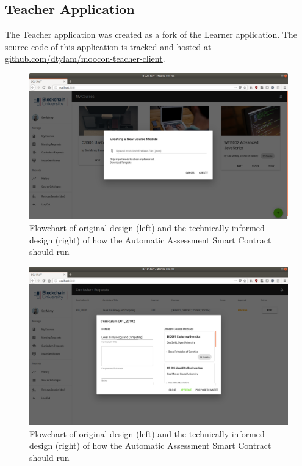 \subsection{Teacher Application}

The Teacher application was created as a fork of the Learner application. 
The source code of this application is tracked and hosted at 
\href{https://github.com/dtylam/moocon-teacher-client}{\underline{github.com/dtylam/moocon-teacher-client}}.

\begin{figure}[!ht]
	\centering
	\includegraphics[width=1.0\textwidth]{Teacher_createcourse}
	\caption[Teacher Application My Courses Page]
	{Flowchart of original design (left) and the technically informed design (right) of how the Automatic Assessment Smart Contract should run}
	\label{fig:Teacher_createcourse}
\end{figure}

\begin{figure}[!ht]
	\centering
	\includegraphics[width=1.0\textwidth]{Teacher_approvecurr}
	\caption[Teacher Application Curriculum Requests Page]
	{Flowchart of original design (left) and the technically informed design (right) of how the Automatic Assessment Smart Contract should run}
	\label{fig:Teacher_approvecurr}
\end{figure}

